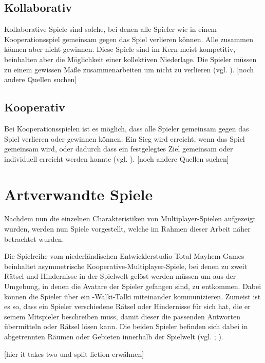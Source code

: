 \subsection{Kollaborativ}
Kollaborative Spiele sind solche, bei denen alle Spieler wie in einem Kooperationsspiel gemeinsam gegen das Spiel verlieren können. Alle zusammen können aber nicht gewinnen. Diese Spiele sind im Kern meist kompetitiv, beinhalten aber die Möglichkeit einer kollektiven Niederlage. Die Spieler müssen zu einem gewissen Maße zusammenarbeiten um nicht zu verlieren (vgl. \cite{noauthor_game_2014}). [noch andere Quellen suchen]

\subsection{Kooperativ}
Bei Kooperationsspielen ist es möglich, dass alle Spieler gemeinsam gegen das Spiel verlieren oder gewinnen können. Ein Sieg wird erreicht, wenn das Spiel gemeinsam  wird, oder dadurch dass ein festgelegtes Ziel gemeinsam oder individuell erreicht werden konnte (vgl. \cite{noauthor_game_2014}). [noch andere Quellen suchen]

\section{Artverwandte Spiele}
Nachdem nun die einzelnen Charakteristiken von Multiplayer-Spielen aufgezeigt wurden, werden nun Spiele vorgestellt, welche im Rahmen dieser Arbeit näher betrachtet wurden.

Die Spielreihe  vom niederländischen Entwicklerstudio Total Mayhem Games beinhaltet asymmetrische Kooperative-Multiplayer-Spiele, bei denen zu zweit Rätsel und Hindernisse in der Spielwelt gelöst werden müssen um aus der Umgebung, in denen die Avatare der Spieler gefangen sind, zu entkommen. Dabei können die Spieler über ein -Walki-Talki miteinander kommunizieren. Zumeist ist es so, dass ein Spieler verschiedene Rätsel oder Hindernisse für sich hat, die er seinem Mitspieler beschreiben muss, damit dieser die passenden Antworten übermitteln oder Rätsel lösen kann. Die beiden Spieler befinden sich dabei in abgetrennten Räumen oder Gebieten innerhalb der Spielwelt (vgl. \cite{noauthor_we_nodate}; \cite{noauthor_total_nodate}).  

[hier it takes two und split fiction erwähnen]

